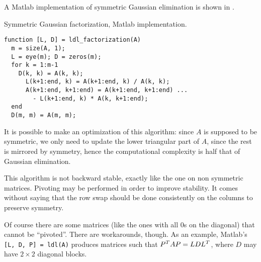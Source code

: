 \documentclass[computationalMathematics.tex]{subfiles}
\begin{document}
A Matlab implementation of symmetric Gaussian elimination is shown in .

\begin{center}
\begin{minipage}{.9\linewidth}
  \begin{algorithm}[H]
    \caption{Symmetric Gaussian factorization, Matlab implementation.}\label{algo:23novsymgauss}
    \begin{verbatim}
function [L, D] = ldl_factorization(A)
  m = size(A, 1);
  L = eye(m); D = zeros(m);
  for k = 1:m-1
    D(k, k) = A(k, k);
	  L(k+1:end, k) = A(k+1:end, k) / A(k, k);
	  A(k+1:end, k+1:end) = A(k+1:end, k+1:end) ...
        - L(k+1:end, k) * A(k, k+1:end);
  end
  D(m, m) = A(m, m);
    \end{verbatim}
  \end{algorithm}
\end{minipage}
\end{center}
\vspace{0.5cm}

It is possible to make an optimization of this algorithm: since $A$ is supposed to be symmetric, we only need to update the lower triangular part of $A$, since the rest is mirrored by symmetry, hence the computational complexity is half that of Gaussian elimination.

This algorithm is not backward stable, exactly like the one on non symmetric matrices. Pivoting may be performed in order to improve stability. It comes without saying that the row swap should be done consistently on the columns to preserve symmetry.

Of course there are some matrices (like the ones with all $0$s on the diagonal) that cannot be ``pivoted''. There are workarounds, though. As an example, Matlab's \texttt{[L, D, P] = ldl(A)} produces matrices such that ${P}^{T}AP=LD{L}^{T}$, where $D$ may have $2\times 2$ diagonal blocks.

\end{document}
